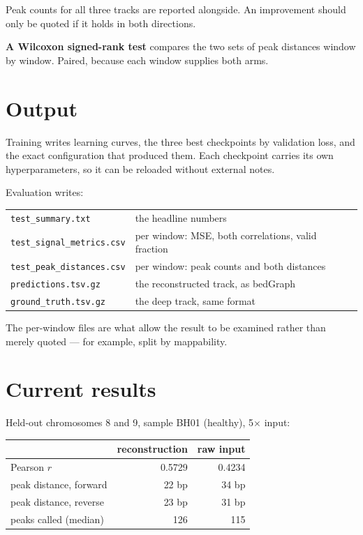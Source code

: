 \documentclass[11pt,a4paper]{article}
\begin{document}
Peak counts for all three tracks are reported alongside. An improvement should only
be quoted if it holds in both directions.

\textbf{A Wilcoxon signed-rank test} compares the two sets of peak distances window
by window. Paired, because each window supplies both arms.

\section{Output}

Training writes learning curves, the three best checkpoints by validation loss, and
the exact configuration that produced them. Each checkpoint carries its own
hyperparameters, so it can be reloaded without external notes.

Evaluation writes:

\begin{center}
\begin{tabular}{ll}
\toprule
\texttt{test\_summary.txt}        & the headline numbers \\
\texttt{test\_signal\_metrics.csv} & per window: MSE, both correlations, valid fraction \\
\texttt{test\_peak\_distances.csv} & per window: peak counts and both distances \\
\texttt{predictions.tsv.gz}       & the reconstructed track, as bedGraph \\
\texttt{ground\_truth.tsv.gz}     & the deep track, same format \\
\bottomrule
\end{tabular}
\end{center}

The per-window files are what allow the result to be examined rather than merely
quoted --- for example, split by mappability.

\section{Current results}

Held-out chromosomes 8 and 9, sample BH01 (healthy), 5$\times$ input:

\begin{center}
\begin{tabular}{lrr}
\toprule
 & \textbf{reconstruction} & \textbf{raw input} \\
\midrule
Pearson $r$                 & 0.5729 & 0.4234 \\
peak distance, forward      & 22 bp  & 34 bp  \\
peak distance, reverse      & 23 bp  & 31 bp  \\
peaks called (median)       & 126    & 115    \\
\bottomrule
\end{tabular}
\end{center}
\end{document}

